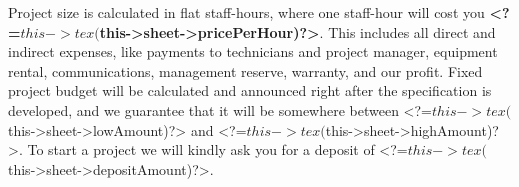 
Project size is calculated in flat staff-hours, where one staff-hour
will cost you \textbf{<?=$this->tex($this->sheet->pricePerHour)?>}. This includes
all direct and indirect expenses, like payments to technicians and project 
manager, equipment rental, communications, management reserve, warranty,
and our profit. Fixed project budget will be calculated and announced
right after the specification is developed, and we guarantee that it
will be somewhere between <?=$this->tex($this->sheet->lowAmount)?>{}
and <?=$this->tex($this->sheet->highAmount)?>.
To start a project we will kindly ask you for a deposit
of <?=$this->tex($this->sheet->depositAmount)?>.
